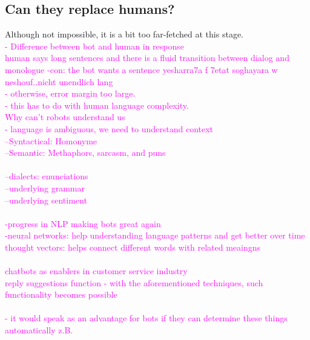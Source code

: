 \subsection{Can they replace humans?}
Although not impossible, it is a bit too far-fetched at this stage.\\
\textcolor{magenta}{
-	Difference between bot and human in response\\
human says long sentences and there is a fluid transition between dialog and monologue 
-con: the bot wants a sentence yesharra7a f 7etat soghayara w neshouf..nicht unendlich lang\\
- otherwise, error margin too large.\\
- this has to do with human language complexity.\\
Why can't robots understand us\\
- language is ambiguous, we need to understand context\\
--Syntactical: Homonyme\\ %
--Semantic:  Methaphors, %
sarcasm, %
and puns\\
\\
--dialects: enunciations\\
--underlying grammar\\ %
--underlying sentiment\\
\\
-progress in NLP making bots great again\\
-neural networks: help understanding language patterns and get better over time\\
thought vectors: helps connect different words with related meaingns\\
\\
chatbots as enablers in customer service industry\\
reply suggestions function - with the aforementioned techniques, such functionality becomes possible\\
\\
- it would speak as an advantage for bots if they can determine these things automatically z.B.\\
}
